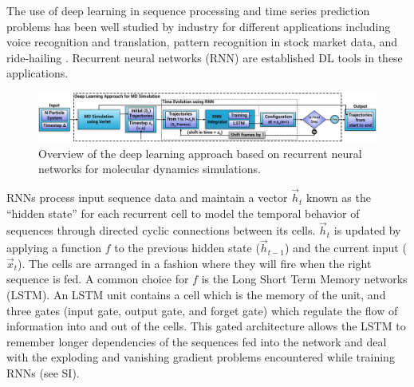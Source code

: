 \documentclass[aps,prl,twocolumn,superscriptaddress,tightenlines,longbibliography, reprint]{revtex4-1}
\begin{document}
The use of deep learning in sequence processing and time series prediction problems has been well studied by industry for different applications including voice recognition and translation, pattern recognition in stock market data, and ride-hailing \cite{gcfref6}. Recurrent neural networks (RNN) are established DL tools in these applications. 
\begin{figure}[htb]
\centering
\includegraphics[width=1.0\textwidth]{figures/fig2.jpg}
\caption{Overview of the deep learning approach based on recurrent neural networks for molecular dynamics simulations.}
\label{fig:RNN_overview}
\end{figure}
RNNs process input sequence data and maintain a vector $\vec{h}_t$ known as the ``hidden state'' for each recurrent cell to model the temporal behavior of sequences through directed cyclic connections between its cells. $\vec{h}_t$ is updated by applying a function $f$ to the previous hidden state ($\vec{h}_{t-1}$) and the current input ($\vec{x}_{t}$).
The cells are arranged in a fashion where they will fire when the right sequence is fed. 
A common choice for $f$ is the Long Short Term Memory networks (LSTM). 
An LSTM unit contains a cell which is the memory of the unit, and three gates (input gate, output gate, and forget gate) which regulate the flow of information into and out of the cells. This gated architecture allows the LSTM to remember longer dependencies of the sequences fed into the network and deal with the exploding and vanishing gradient problems encountered while training RNNs (see SI).
\end{document}
